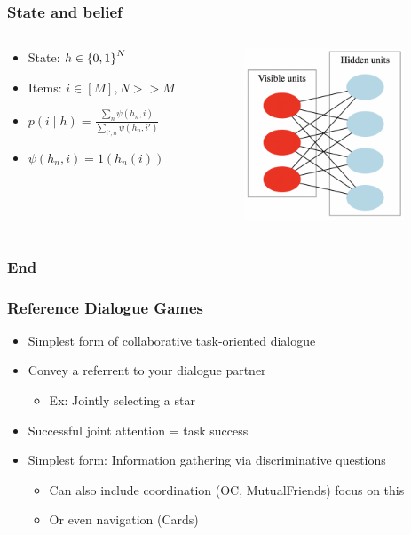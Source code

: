 \documentclass{beamer}
\begin{document}
\begin{frame}
\frametitle{State and belief}
\begin{columns}
\begin{column}{0.5\textwidth}
\begin{itemize}
\item State: $h \in \left\{0,1\right\}^N$
\item Items: $i \in [M], N >> M$
\item $p(i \mid h) = \frac{\sum_n \psi(h_n, i)}{\sum_{i',n} \psi(h_n, i')}$
\item $\psi(h_n, i) = 1(h_n(i))$ 
\end{itemize}
\end{column}
\begin{column}{0.5\textwidth}
\centering
\includegraphics[height=2in]{img/rbm.png}
\end{column}
\end{columns}
\end{frame}

\begin{frame}
\frametitle{End}
\end{frame}

\begin{frame}
\frametitle{Reference Dialogue Games}
\begin{itemize}
\item Simplest form of collaborative task-oriented dialogue
\item Convey a referrent to your dialogue partner
    \begin{itemize}
    \item Ex: Jointly selecting a star
    \end{itemize}
\item Successful joint attention = task success

\item Simplest form: Information gathering via discriminative questions
    \begin{itemize}
    \item Can also include coordination (OC, MutualFriends) focus on this
    \item Or even navigation (Cards)
    \end{itemize}

\end{itemize}
\end{frame}
\end{document}
